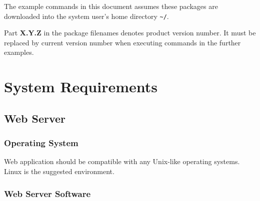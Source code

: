 \documentclass[12pt]{article}
\newcommand{\vigReleasePath}{\textasciitilde/}
\newcommand{\vigReleaseVersion}{X.Y.Z}
\begin{document}
The example commands in this document assumes these packages are downloaded into the system user's home directory \texttt{{\vigReleasePath}}.

Part \textbf{\vigReleaseVersion} in the package filenames denotes product version number. It must be replaced by current version number when executing commands in the further examples.

\section{System Requirements}

\subsection{Web Server}

\subsubsection{Operating System}

Web application should be compatible with any Unix-like operating systems. Linux is the suggested environment.

\subsubsection{Web Server Software}
\end{document}
